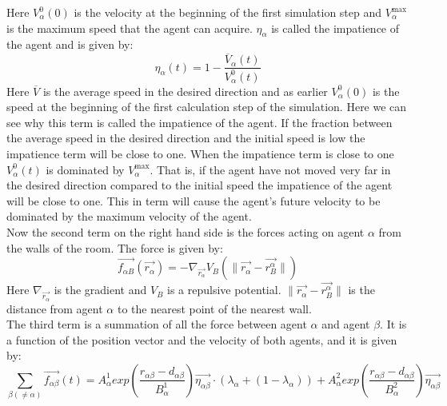 Here $V_{\alpha}^{0} \left( 0 \right)$ is the velocity at the beginning of the first simulation step and $V_{\alpha}^{\text{max}}$ is the maximum speed that the agent can acquire. $\eta_{\alpha}$ is called the impatience of the agent and is given by:
\begin{equation}
	\eta_{\alpha} \left( t \right) = 1 - \frac{\overline{V}_{\alpha} \left( t \right)}{V_{\alpha}^{0} \left( t \right)}
\end{equation}
Here $\overline{V}$ is the average speed in the desired direction and as earlier $V_{\alpha}^{0} \left( 0 \right)$ is the speed at the beginning of the first calculation step of the simulation. Here we can see why this term is called the impatience of the agent. If the fraction between the average speed in the desired direction and the initial speed is low the impatience term will be close to one. When the impatience term is close to one $V_{\alpha}^{0} \left( t \right)$ is dominated by $V_{\alpha}^{\text{max}}$. That is, if the agent have not moved very far in the desired direction compared to the initial speed the impatience of the agent will be close to one. This in term will cause the agent's future velocity to be dominated by the maximum velocity of the agent.\\
Now the second term on the right hand side is the forces acting on agent $\alpha$ from the walls of the room. The force is given by:
\begin{equation}
\vec{f_{\alpha B}} \left( \vec{r_{\alpha}} \right) = - \nabla_{\vec{r_{\alpha}}} V_{B} \left( \| \vec{r_{\alpha}} - \vec{r_{B}^{\alpha}} \| \right) 
\end{equation}
Here $\nabla_{\vec{r_{\alpha}}}$ is the gradient and $V_B$ is a repulsive potential. $ \| \vec{r_{\alpha}} - \vec{r_{B}^{\alpha}} \|$ is the distance from agent $\alpha$ to the nearest point of the nearest wall.\\
The third term is a summation of all the force between agent $\alpha$ and agent $\beta$. It is a function of the position vector and the velocity of both agents, and it is given by:
\begin{equation}\label{agentinteraction}
\sum_{\beta \left( \neq \alpha \right)} \vec{f_{\alpha \beta }}\left( t \right) = 
A_{\alpha}^{1} exp \left( \frac{ r_{\alpha \beta} - d_{\alpha \beta }}{B_{\alpha}^1} \right)
\vec{\eta_{\alpha \beta}} \cdot 
\left( \lambda_{\alpha} + \left( 1 - \lambda_{\alpha} \right)  \right)+ 
A_{\alpha}^{2} exp\left(\frac{r_{\alpha \beta} - d_{\alpha \beta}}{B_{\alpha}^{2}} \right)\vec{\eta_{\alpha \beta}}
\end{equation}
